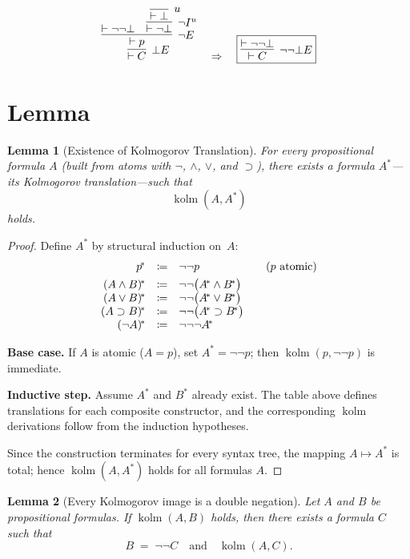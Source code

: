 \documentclass{article}
\newtheorem{lemma}{Lemma}
\begin{document}
\[
\infer[\bot E]{\vdash C}{
  \infer[\neg E]{\vdash p}{
    \vdash \neg\neg\bot
    &
    \infer[\neg I^{u}]{\vdash \neg\bot}{
      \infer[u]{\vdash \bot}{}
    }
  }
}
\quad \Rightarrow \quad
\fbox{$
  \infer[\neg\neg\bot E]{\vdash C}{\vdash \neg\neg\bot}
$}
\]


\section{Lemma}
\begin{lemma}[Existence of Kolmogorov Translation]\label{lem:exists-kolm}
  For every propositional formula $A$ (built from atoms with
  $\neg$, $\land$, $\lor$, and $\supset$), there exists a formula
  $A^{\!*}$—its Kolmogorov translation—such that
  \[
    \operatorname{kolm}(A,A^{\!*})
  \]
  holds.
  \end{lemma}
  
  \begin{proof}
  Define $A^{\!*}$ by structural induction on $A$:
  \[
  \begin{array}{rcl@{\qquad}l}
  p^{\!*}              &\coloneqq& \neg\neg p &(\text{$p$ atomic})\\[4pt]
  (A \land B)^{\!*}    &\coloneqq& \neg\neg\bigl(A^{\!*}\land B^{\!*}\bigr)\\
  (A \lor  B)^{\!*}    &\coloneqq& \neg\neg\bigl(A^{\!*}\lor  B^{\!*}\bigr)\\
  (A \supset B)^{\!*}  &\coloneqq& \neg\neg\bigl(A^{\!*}\supset B^{\!*}\bigr)\\
  (\neg A)^{\!*}       &\coloneqq& \neg\neg\neg A^{\!*}
  \end{array}
  \]
  
  \noindent
  \textbf{Base case.}  If $A$ is atomic ($A=p$), set $A^{\!*}=\neg\neg p$; then
  $\operatorname{kolm}(p,\neg\neg p)$ is immediate.
  
  \smallskip
  \noindent
  \textbf{Inductive step.}  Assume $A^{\!*}$ and $B^{\!*}$ already exist.
  The table above defines translations for each composite constructor,
  and the corresponding $\operatorname{kolm}$ derivations follow from
  the induction hypotheses.
  
  \smallskip
  Since the construction terminates for every syntax tree, the
  mapping $A\mapsto A^{\!*}$ is total; hence
  $\operatorname{kolm}(A,A^{\!*})$ holds for all formulas $A$.
  \end{proof}


  \begin{lemma}[Every Kolmogorov image is a double negation]
    \label{lem:outer-dneg}
    Let $A$ and $B$ be propositional formulas.
    If \(\operatorname{kolm}(A,B)\) holds, then there exists a formula
    \(C\) such that
    \[
       B \;=\; \neg\neg C
       \quad\text{and}\quad
       \operatorname{kolm}(A,C).
    \]
    \end{lemma}
    
\end{document}
